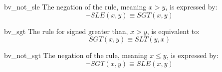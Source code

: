 \begin{RuleDescription}{bv_not_sle}
    The negation of the \currule{} rule, meaning $x > y$, is expressed by:
    \[
        \neg SLE(x, y) \equiv SGT(x, y)
    \]
\end{RuleDescription}

\begin{RuleDescription}{bv_sgt}
    The \currule{} rule for signed greater than, $x > y$, is equivalent to:
    \[
        SGT(x, y) \equiv SLT(y, x)
    \]
\end{RuleDescription}

\begin{RuleDescription}{bv_not_sgt}
    The negation of the \currule{} rule, meaning $x \leq y$, is expressed by:
    \[
        \neg SGT(x, y) \equiv SLE(x, y)
    \]
\end{RuleDescription}

\newpage